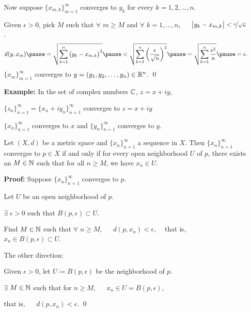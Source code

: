 \documentclass[10pt,aspectratio=149]{beamer}
\begin{document}
\begin{frame}

Now suppose
$\{ x_{m,k} \}_{m=1}^\infty$ converges to $y_k$ for every $k=1,2,\ldots,n$.

\pause
\medskip

Given $\epsilon > 0$, pick $M$ such that $\forall$ $m \geq M$ and
$\forall$ $k = 1,\ldots,n$, ~~
$\bigl\lvert y_k-x_{m,k} \bigr\rvert < \nicefrac{\epsilon}{\sqrt{n}}$.
\pause
\begin{equation*}
d(y,x_m)
\pause
=
\sqrt{\sum_{k=1}^n {\bigl(y_k-x_{m,k}\bigr)}^2}
\pause
<
\sqrt{\sum_{k=1}^n {\left(\frac{\epsilon}{\sqrt{n}}\right)}^2}
\pause
=
\sqrt{\sum_{k=1}^n \frac{{\epsilon^2}}{n}}
\pause
= \epsilon .
\end{equation*}
\pause
\thus \quad
$\{ x_m \}_{m=1}^\infty$ converges to
$y = (y_1,y_2,\ldots,y_n) \in {\mathbb{R}}^n$.
\qed



\pause
\bigskip

\textbf{Example:}
In the set of complex numbers ${\mathbb{C}}$, $z = x+iy$,

\pause
$\{ z_n \}_{n=1}^\infty = \{ x_n + iy_n \}_{n=1}^\infty$ converges
to $z = x+iy$

\pause
\wiffif

$\{ x_n \}_{n=1}^\infty$ converges to $x$
and 
$\{ y_n \}_{n=1}^\infty$ converges to $y$.

\end{frame}

\begin{frame}

\begin{proposition}
Let $(X,d)$ be a metric space and $\{x_n\}_{n=1}^\infty$ a sequence in $X$.  Then
$\{ x_n \}_{n=1}^\infty$ converges to $p \in X$ if and only if for every open neighborhood
$U$ of $p$, there exists an $M \in {\mathbb{N}}$ such that for all $n \geq M$,
we have $x_n \in U$.
\end{proposition}

\pause
\textbf{Proof:}
Suppose $\{ x_n \}_{n=1}^\infty$ converges to $p$.

\pause
Let $U$ be an open neighborhood of $p$.

\pause
\thus \quad $\exists$ $\epsilon > 0$ such that $B(p,\epsilon) \subset U$.

\pause
Find $M \in {\mathbb{N}}$ such that $\forall$ $n \geq M$, ~~ $d(p,x_n) < \epsilon$,
\pause
~~that is,~~ $x_n \in B(p,\epsilon) \subset U$.

\pause
\medskip

The other direction:

\pause
Given $\epsilon > 0$, let $U \coloneqq B(p,\epsilon)$ be the neighborhood of $p$.

\pause
\thus \quad $\exists$ $M \in {\mathbb{N}}$
such that for $n \geq M$, ~~ $x_n \in U = B(p,\epsilon)$,

\pause
that is, ~~ $d(p,x_n) < \epsilon$.
\qed

\end{frame}
\end{document}
